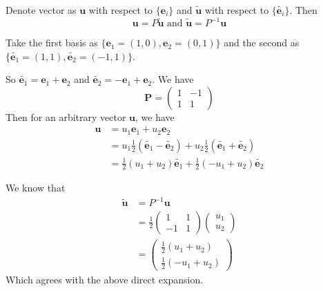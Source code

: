 \documentclass[a4paper]{article}
\begin{document}
      \begin{thm}Denote vector as $\mathbf{u}$ with respect to $\{\mathbf{e}_i\}$ and $\tilde{\mathbf{u}}$ with respect to $\{\tilde{\mathbf{e}_i}\}$. Then 
        \[
          \mathbf{u} = P\mathbf{\tilde{u}}\text{ and }\mathbf{\tilde{u}} = P^{-1}\mathbf{u}
        \]
      \end{thm}

      \begin{eg}
        Take the first basis as $\{\mathbf{e}_1 = (1, 0), \mathbf{e}_2 = (0, 1)\}$ and the second as $\{\tilde{\mathbf{e}_1} = (1, 1), \tilde{\mathbf{e}_2} = (-1, 1)\}$.

        So $\tilde{\mathbf{e}_1} = \mathbf{e}_1 + \mathbf{e}_2$ and $\tilde{\mathbf{e}_2} = -\mathbf{e}_1 + \mathbf{e}_2$. We have
        \[
          \mathbf{P} = 
          \begin{pmatrix}
            1 & -1\\
            1 & 1
          \end{pmatrix}
        \]
        Then for an arbitrary vector $\mathbf{u}$, we have
        \begin{align*}
          \mathbf{u}&= u_1\mathbf{e}_1 + u_2\mathbf{e}_2\\
          &= u_1\frac{1}{2}(\tilde{\mathbf{e}_1} - \tilde{\mathbf{e}_2}) + u_2\frac{1}{2}(\tilde{\mathbf{e}_1} + \tilde{\mathbf{e}_2})\\
          &= \frac{1}{2}(u_1 + u_2)\tilde{\mathbf{e}_1} + \frac{1}{2}(-u_1 + u_2)\tilde{\mathbf{e}_2}
        \end{align*}

        We know that
        \begin{align*}
          \mathbf{\tilde{u}} &= P^{-1} \mathbf{u}\\
          &= \frac{1}{2}
          \begin{pmatrix}
            1&1\\-1&1
          \end{pmatrix}
          \begin{pmatrix}
            u_1\\u_2
          \end{pmatrix}\\
          &= 
          \begin{pmatrix}
            \frac{1}{2}(u_1 + u_2)\\
            \frac{1}{2}(-u_1 + u_2)
          \end{pmatrix}
        \end{align*}
        Which agrees with the above direct expansion.
      \end{eg}
\end{document}
